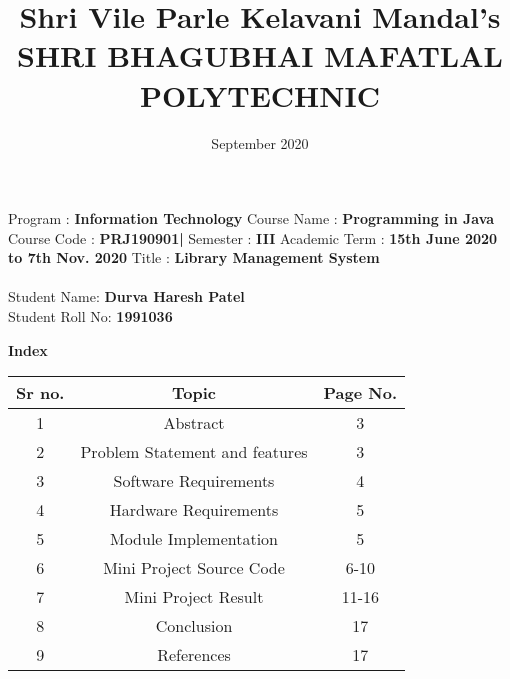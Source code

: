 \documentclass{article}
\title{Shri Vile Parle Kelavani Mandal’s\\
\textbf {SHRI BHAGUBHAI MAFATLAL POLYTECHNIC}
}
\author{}
\date{September 2020}
\begin{document}
\maketitle \LARGE
{
Program : \textbf {Information Technology}\newline 
Course Name : \textbf {Programming in Java}\newline
Course Code : \textbf {PRJ190901|}\newline
Semester : \textbf {III}\newline
Academic Term : \textbf {15th June 2020 to 7th Nov. 2020}
}
\newline
Title : \textbf{Library Management System}\\
\\
Student Name: \textbf{Durva Haresh Patel}\\
Student Roll No: \textbf{1991036}

\newpage

\begin{center}
\textbf{Index}\newline\newline
\begin{tabular}{ |c|c|c| } 
 \hline
 \textbf {Sr no.}  & \textbf{Topic }  & \textbf{Page No.} \\
 \hline
1 & Abstract  & 3  \\ 
 \hline
2 & Problem Statement and features & 3\\ 
  \hline
3 & Software Requirements & 4 \\ 
 \hline
4 & Hardware Requirements & 5 \\ 
  \hline
5 & Module Implementation & 5 \\ 
 \hline
6 & Mini Project Source Code & 6-10 \\ 
  \hline
7 & Mini Project Result & 11-16 \\ 
 \hline
8 & Conclusion & 17 \\ 
 \hline
9 & References & 17 \\ 
 \hline
\end{tabular}
\end{center}

\newpage
\end{document}
